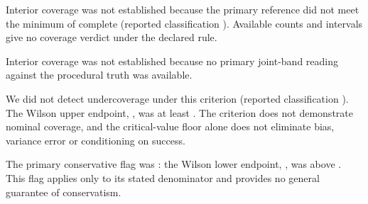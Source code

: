 Interior coverage was not established because the primary reference did not meet the minimum of  complete  (reported classification \texttt{}). %
Available counts and intervals give no coverage verdict under the declared rule. %

Interior coverage was not established because no primary joint-band reading against the procedural truth was available. %

We did not detect undercoverage under this criterion (reported classification \texttt{}). The Wilson upper endpoint, , was at least . %
The criterion does not demonstrate nominal coverage, and the critical-value floor alone does not eliminate bias, variance error or conditioning on success. %

The primary conservative flag was : the Wilson lower endpoint, , was above . This flag applies only to its stated denominator and provides no general guarantee of conservatism. %

